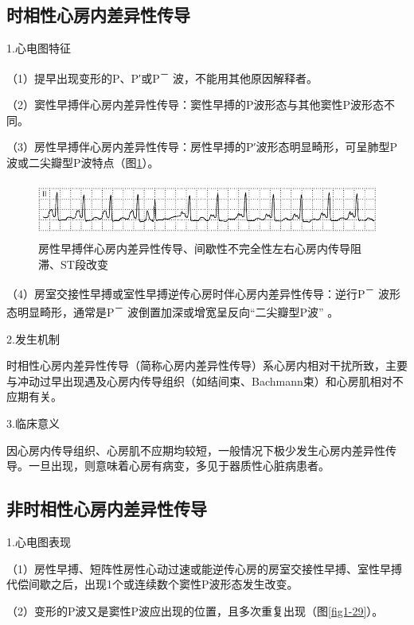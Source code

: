 \subsection{时相性心房内差异性传导}

1.心电图特征

（1）提早出现变形的P、P′或P\textsuperscript{－}
波，不能用其他原因解释者。

（2）窦性早搏伴心房内差异性传导：窦性早搏的P波形态与其他窦性P波形态不同。

（3）房性早搏伴心房内差异性传导：房性早搏的P′波形态明显畸形，可呈肺型P波或二尖瓣型P波特点（图\ref{fig1-28}）。

\begin{figure}[!htbp]
 \centering
 \includegraphics[width=5.64583in,height=0.72917in]{./images/Image00034.jpg}
 \captionsetup{justification=centering}
 \caption{房性早搏伴心房内差异性传导、间歇性不完全性左右心房内传导阻滞、ST段改变}
 \label{fig1-28}
  \end{figure} 

（4）房室交接性早搏或室性早搏逆传心房时伴心房内差异性传导：逆行P\textsuperscript{－}
波形态明显畸形，通常是P\textsuperscript{－}
波倒置加深或增宽呈反向“二尖瓣型P波” 。

2.发生机制

时相性心房内差异性传导（简称心房内差异性传导）系心房内相对干扰所致，主要与冲动过早出现遇及心房内传导组织（如结间束、Bachmann束）和心房肌相对不应期有关。

3.临床意义

因心房内传导组织、心房肌不应期均较短，一般情况下极少发生心房内差异性传导。一旦出现，则意味着心房有病变，多见于器质性心脏病患者。

\protect\hypertarget{text00007.htmlux5cux23subid27}{}{}

\subsection{非时相性心房内差异性传导}

1.心电图表现

（1）房性早搏、短阵性房性心动过速或能逆传心房的房室交接性早搏、室性早搏代偿间歇之后，出现1个或连续数个窦性P波形态发生改变。

（2）变形的P波又是窦性P波应出现的位置，且多次重复出现（图\ref{fig1-29}）。

